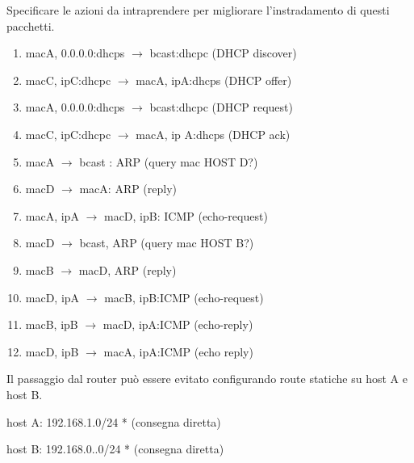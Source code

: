             Specificare le azioni da intraprendere per migliorare l'instradamento di questi pacchetti.
            
            \solution
            \begin{enumerate}
                \item macA,  0.0.0.0:dhcps $\rightarrow$ bcast:dhcpc  (DHCP discover)

                \item macC, ipC:dhcpc $\rightarrow$ macA, ipA:dhcps (DHCP offer)
                
                \item macA, 0.0.0.0:dhcps $\rightarrow$ bcast:dhcpc (DHCP request)
                
                \item macC, ipC:dhcpc $\rightarrow$ macA, ip A:dhcps (DHCP ack)
                
                \item macA $\rightarrow$ bcast : ARP (query mac HOST D?)
                
                \item macD $\rightarrow$ macA: ARP (reply)
                
                \item macA, ipA $\rightarrow$ macD, ipB: ICMP  (echo-request)
                
                \item macD $\rightarrow$ bcast, ARP (query mac HOST B?)
                
                \item macB $\rightarrow$ macD, ARP (reply)
                
                \item macD, ipA $\rightarrow$ macB, ipB:ICMP (echo-request)
                
                \item macB, ipB $\rightarrow$ macD, ipA:ICMP (echo-reply)
                
                \item macD, ipB $\rightarrow$ macA, ipA:ICMP (echo reply)
            \end{enumerate}

            Il passaggio dal router può essere evitato configurando route statiche su host A e host B.

            host A: 192.168.1.0/24 * (consegna diretta)

            host B: 192.168.0..0/24 * (consegna diretta) 

